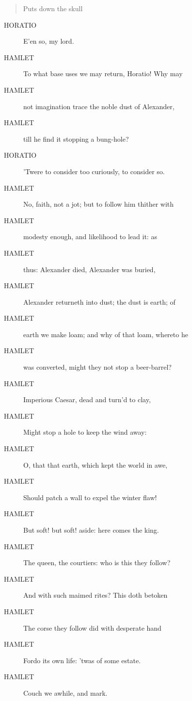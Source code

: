\documentclass{article}
\begin{document}
\begin{quote}
Puts down the skull
\end{quote}
          
\begin{description}
            
\item[HORATIO] E'en so, my lord.
\end{description}
          
\begin{description}
            
\item[HAMLET] To what base uses we may return, Horatio! Why may
\item[HAMLET] not imagination trace the noble dust of Alexander,
\item[HAMLET] till he find it stopping a bung-hole?
\end{description}
          
\begin{description}
            
\item[HORATIO] 'Twere to consider too curiously, to consider so.
\end{description}
          
\begin{description}
            
\item[HAMLET] No, faith, not a jot; but to follow him thither with
\item[HAMLET] modesty enough, and likelihood to lead it: as
\item[HAMLET] thus: Alexander died, Alexander was buried,
\item[HAMLET] Alexander returneth into dust; the dust is earth; of
\item[HAMLET] earth we make loam; and why of that loam, whereto he
\item[HAMLET] was converted, might they not stop a beer-barrel?
\item[HAMLET] Imperious Caesar, dead and turn'd to clay,
\item[HAMLET] Might stop a hole to keep the wind away:
\item[HAMLET] O, that that earth, which kept the world in awe,
\item[HAMLET] Should patch a wall to expel the winter flaw!
\item[HAMLET] But soft! but soft! aside: here comes the king.
\item[HAMLET] The queen, the courtiers: who is this they follow?
\item[HAMLET] And with such maimed rites? This doth betoken
\item[HAMLET] The corse they follow did with desperate hand
\item[HAMLET] Fordo its own life: 'twas of some estate.
\item[HAMLET] Couch we awhile, and mark.
\end{description}
          
\end{document}
